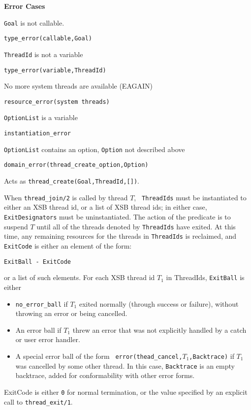 \begin{description}
{\bf Error Cases}
\bi
\item 	{\tt Goal} is not callable.
\bi
\item 	{\tt type\_error(callable,Goal)}
\ei
\item 	{\tt ThreadId} is not a variable
\bi
\item 	{\tt type\_error(variable,ThreadId)}
\ei
\item   No more system threads are available (EAGAIN)
\bi
\item {\tt resource\_error(system threads)}
\ei
\item 	{\tt OptionList} is a variable
\bi
\item 	{\tt instantiation\_error}
\ei
\item 	{\tt OptionList} contains an option, {\tt Option} not described above
\bi
\item 	{\tt domain\_error(thread\_create\_option,Option)}
\ei
\ei

%
Acts as {\tt thread\_create(Goal,ThreadId,[])}.

% 
When {\tt thread\_join/2} is called by thread $T$, {\tt
  ThreadIds} must be instantiated to either an XSB thread id, or a
list of XSB thread ids; in either case, {\tt ExitDesignators} must be
uninstantiated.  The action of the predicate is to suspend $T$ until
all of the threads denoted by {\tt ThreadIds} have exited.  At this
time, any remaining resources for the threads in {\tt ThreadIds} is
reclaimed, and {\tt ExitCode} is either an element of the form:
\begin{center}
{\tt ExitBall -  ExitCode} 
\end{center}
%
or a list of such elements.  For each XSB thread id $T_1$ in
{ThreadIds}, {\tt ExitBall} is either
\begin{itemize}
%
\item {\tt no\_error\_ball} if $T_1$ exited normally (through success or
  failure), without throwing an error or being cancelled.
%
\item An error ball if $T_1$ threw an error that was not explicitly
  handled by a catch or user error handler.
%
\item A special error ball of the form {\tt
  error(thead\_cancel,$T_1$,Backtrace)} if $T_1$ was cancelled by some
  other thread.  In this case, {\tt Backtrace} is an empty backtrace,
  added for conformability with other error forms.
\end{itemize}
%
ExitCode is either {\tt 0} for normal termination, or the value
specified by an explicit call to {\tt thread\_exit/1}.


\end{description}
